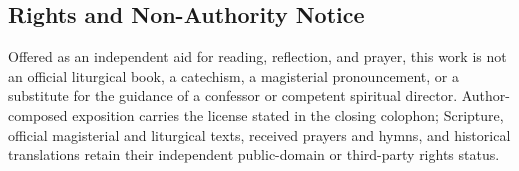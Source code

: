\subsection*{Rights and Non-Authority Notice}

Offered as an independent aid for reading, reflection, and prayer, this work is not an official liturgical book, a catechism, a magisterial pronouncement, or a substitute for the guidance of a confessor or competent spiritual director. Author-composed exposition carries the license stated in the closing colophon; Scripture, official magisterial and liturgical texts, received prayers and hymns, and historical translations retain their independent public-domain or third-party rights status.
